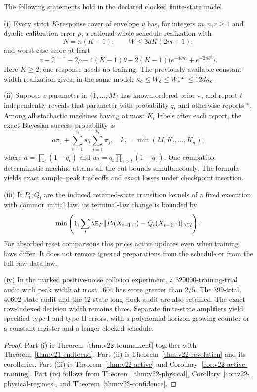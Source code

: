 \begin{theorem}
\label{thm:v22-main}
The following statements hold in the declared clocked finite-state
model.

\smallskip\noindent
\textup{(i)} Every strict $K$-response cover of envelope $v$ has, for
integers $m,n,r\ge1$ and dyadic calibration error $\rho$, a rational
whole-schedule realization with
\[
 N=n(K-1),\qquad W\le3dK(2m+1),
\]
and worst-case score at least
\[
 v-2^{1-r}-2\rho-4(K-1)\theta
       -2(K-1)\bigl(e^{-4\theta m}+e^{-2n\theta^2}\bigr).
\]
Here $K\ge2$; one response needs no training. The previously available
constant-width realization gives, in the same model,
$\kappa_c\le W_c\le W_c^{\rm rat}\le12d\kappa_c$.

\smallskip\noindent
\textup{(ii)} Suppose a parameter in $\{1,\ldots,M\}$ has known ordered
prior $\pi$, and report $t$ independently reveals that parameter with
probability $q_t$ and otherwise reports $*$. Among all stochastic
machines having at most $K_t$ labels after each report, the exact
Bayesian success probability is
\[
 a\pi_1+\sum_{t=1}^n w_t\sum_{j=1}^{k_t}\pi_j,
 \quad
 k_t=\min(M,K_t,\ldots,K_n),
\]
where $a=\prod_t(1-q_t)$ and
$w_t=q_t\prod_{s>t}(1-q_s)$. One compatible deterministic machine
attains all the cut bounds simultaneously. The formula yields exact
sample--peak tradeoffs and exact losses under checkpoint insertion.

\smallskip\noindent
\textup{(iii)} If $P_t,Q_t$ are the induced retained-state transition
kernels of a fixed execution with common initial law, its terminal-law
change is bounded by
\[
 \min\left(1,\sum_t\E_P
           \|P_t(X_{t-1},\cdot)-Q_t(X_{t-1},\cdot)\|_{\TV}\right).
\]
For absorbed reset comparisons this prices active updates even when
training laws differ. It does not remove ignored preparations from
the schedule or from the full raw-data law.

\smallskip\noindent
\textup{(iv)} In the marked positive-noise collision experiment, a
$320000$-training-trial audit with peak width at most $1604$ has score
greater than $2/5$. The $399$-trial, $40602$-state audit and the
$12$-state long-clock audit are also retained. The exact row-indexed
decision width remains three. Separate finite-state amplifiers yield
specified type-I and type-II errors, with a polynomial-horizon growing
counter or a constant register and a longer clocked schedule.
\end{theorem}
\begin{proof}
Part (i) is Theorem~\ref{thm:v22-tournament} together with
Theorem~\ref{thm:v21-endtoend}. Part (ii) is
Theorem~\ref{thm:v22-revelation} and its corollaries. Part (iii) is
Theorem~\ref{thm:v22-active} and
Corollary~\ref{cor:v22-active-training}. Part (iv) follows from
Theorem~\ref{thm:v22-physical},
Corollary~\ref{cor:v22-physical-regimes}, and
Theorem~\ref{thm:v22-confidence}.
\end{proof}

